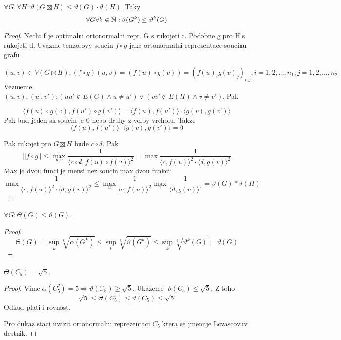 \begin{lemma}
	$\forall G, \forall H: \vartheta(G \boxtimes H) \leq \vartheta(G) \cdot \vartheta(H)$. Taky
	\[ \forall G \forall k \in \operatorname{\mathbb{N}}: \vartheta(G^k) \leq \vartheta^k(G) \]
\end{lemma}
\begin{proof}
	Necht f je optimalni ortonormalni repr. G s rukojeti c. Podobne g pro H s rukojeti d. Uvazme tenzorovy soucin $f \circ g$ jako ortonormalni reprezentace soucinu grafu.

	\[ (u, v) \in V(G \boxtimes H), (f \circ g) (u, v) = (f(u) \circ g(v)) = (f(u)_i g(v)_j)_{i, j}, i = 1, 2, ..., n_1; j = 1,2, ..., n_2\]
	Vezmeme $(u, v), (u', v'): (uu' \notin E(G) \land u \ne u') \lor (vv' \notin E(H) \land v \ne v') $. Pak

	\[ \langle f(u) \circ g(v), f(u') \circ g(v') \rangle = \langle f(u), f(u') \rangle \cdot \langle g(v), g(v') \rangle \]
	Pak bud jeden sk soucin je 0 nebo druhy z volby vrcholu. Takze
	\[ \langle f(u), f(u') \rangle \cdot \langle g(v), g(v') \rangle = 0 \]

	Pak rukojet pro $G \boxtimes H$ bude $c \circ d$. Pak
	\[ || f \circ g || \leq \max_{u, v} \frac{1}{\langle c \circ d, f(u) \circ f(v) \rangle^2} = \max \frac{1}{\langle c, f(u) \rangle^2 \cdot \langle d, g(v) \rangle^2} \]
	Max je dvou funci je mensi nez soucin max dvou funkci:
	\[ \max \frac{1}{\langle c, f(u) \rangle^2 \cdot \langle d, g(v) \rangle^2} \leq \max_u \frac{1}{\langle c, f(u) \rangle^2} \max_v \frac{1}{\langle d, g(v) \rangle^2} = \vartheta(G) * \vartheta(H) \]
\end{proof}

\begin{lemma}
	$\forall G : \Theta(G) \leq \vartheta(G)$.
\end{lemma}
\begin{proof}
	\[ \Theta(G) = \sup_k \sqrt[k]{\alpha(G^k)} \leq \sup_k \sqrt[k]{\vartheta(G^k)} \leq \sup_k \sqrt[k]{\vartheta^k(G)} = \vartheta(G) \]

\end{proof}

\begin{theorem}
	$ \Theta(C_5) = \sqrt{5}$.
\end{theorem}
\begin{proof}
	Vime $ \alpha(C_5^2) = 5 \Rightarrow \vartheta(C_5) \geq \sqrt{5} $. Ukazeme $\ \vartheta(C_5) \leq \sqrt{5}$. Z toho
	\[ \sqrt{5} \leq \Theta(C_5) \leq \vartheta(C_5) \leq \sqrt{5} \]
	Odkud plati i rovnost.

	Pro dukaz staci uvazit ortonormalni reprezentaci $C_5$ ktera se jmenuje Lovascovuv destnik.
\end{proof}

